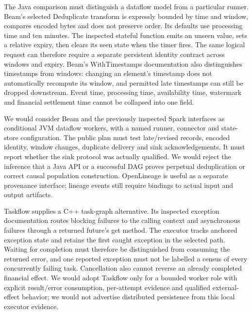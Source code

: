 The Java comparison must distinguish a dataflow model from a particular runner. Beam's selected Deduplicate transform is expressly bounded by time and window, compares encoded bytes and does not preserve order. Its defaults use processing time and ten minutes. The inspected stateful function emits an unseen value, sets a relative expiry, then clears its seen state when the timer fires. The same logical request can therefore require a separate persistent identity contract across windows and expiry. Beam's WithTimestamps documentation also distinguishes timestamps from windows: changing an element's timestamp does not automatically recompute its window, and permitted late timestamps can still be dropped downstream. Event time, processing time, availability time, watermark and financial settlement time cannot be collapsed into one field.~\citep{exec25_dww_beam}

We would consider Beam and the previously inspected Spark interfaces as conditional JVM dataflow workers, with a named runner, connector and state-store configuration. The public plan must test late/revised records, encoded identity, window changes, duplicate delivery and sink acknowledgements. It must report whether the sink protocol was actually qualified. We would reject the inference that a Java API or a successful DAG proves perpetual deduplication or correct causal population construction. OpenLineage is useful as a separate provenance interface; lineage events still require bindings to actual input and output artifacts.~\citep{exec25_otm_spark,exec24_openlineage_source,exec24_openlineage_reference,exec25_dww_choice}

Taskflow supplies a C++ task-graph alternative. Its inspected exception documentation routes blocking failures to the calling context and asynchronous failures through a returned future's get method. The executor tracks anchored exception state and retains the first caught exception in the selected path. Waiting for completion must therefore be distinguished from consuming the returned error, and one reported exception must not be labelled a census of every concurrently failing task. Cancellation also cannot reverse an already completed financial effect. We would adopt Taskflow only for a bounded worker role with explicit result/error consumption, per-attempt evidence and qualified external-effect behavior; we would not advertise distributed persistence from this local executor evidence.~\citep{exec25_dww_taskflow}

